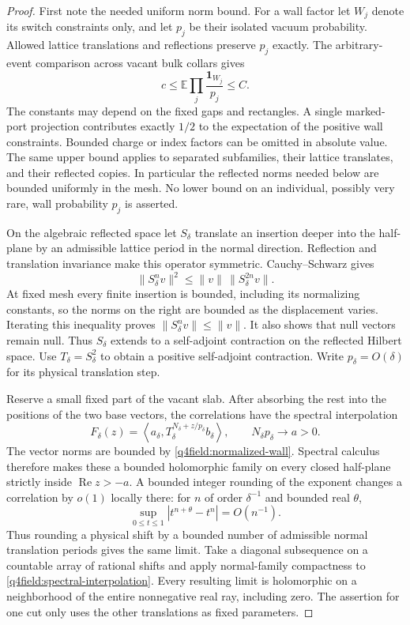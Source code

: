 \begin{proof}
First note the needed uniform norm bound.  For a wall factor let
$W_j$ denote its switch constraints only, and let $p_j$ be their
isolated vacuum probability.  Allowed lattice translations and
reflections preserve $p_j$ exactly.
The arbitrary-event comparison across vacant bulk collars gives
\begin{equation}\label{q4field:normalized-wall}
 c\le\mathbb E\prod_j\frac{\mathbf1_{W_j}}{p_j}\le C.
\end{equation}
The constants may depend on the fixed gaps and rectangles.  A single
marked-port projection contributes exactly $1/2$ to the expectation
of the positive wall constraints.  Bounded charge or index factors
can be omitted in absolute value.  The same upper bound applies to
separated subfamilies, their lattice translates, and their reflected
copies.  In particular the reflected norms needed below are bounded
uniformly in the mesh.  No lower bound on an individual, possibly
very rare, wall probability $p_j$ is asserted.

On the algebraic reflected space let $S_\delta$ translate an insertion
deeper into the half-plane by an admissible lattice period in the
normal direction.  Reflection and translation invariance make this
operator symmetric.  Cauchy--Schwarz gives
\[
 \|S_\delta^n v\|^2
       \le \|v\|\,\|S_\delta^{2n}v\|.
\]
At fixed mesh every finite insertion is bounded, including its
normalizing constants, so the norms on the right are bounded as the
displacement varies.  Iterating this inequality proves
$\|S_\delta^n v\|\le\|v\|$.  It also shows that null vectors remain
null.  Thus $S_\delta$ extends to a self-adjoint contraction on the
reflected Hilbert space.  Use $T_\delta=S_\delta^2$ to obtain a
positive self-adjoint contraction.  Write $p_\delta=O(\delta)$ for
its physical translation step.

Reserve a small fixed part of the vacant slab.  After absorbing the
rest into the positions of the two base vectors, the correlations
have the spectral interpolation
\begin{equation}\label{q4field:spectral-interpolation}
 F_\delta(z)=
  \left\langle a_\delta,
    T_\delta^{N_\delta+z/p_\delta}b_\delta\right\rangle,
 \qquad N_\delta p_\delta\longrightarrow a>0.
\end{equation}
The vector norms are bounded by \eqref{q4field:normalized-wall}.
Spectral calculus therefore makes these a bounded holomorphic
family on every closed half-plane strictly inside
$\operatorname{Re}z>-a$.  A bounded integer rounding of the exponent
changes a correlation by $o(1)$ locally there: for $n$ of order
$\delta^{-1}$ and bounded real $\theta$,
\[
 \sup_{0\le t\le1}|t^{n+\theta}-t^n|=O(n^{-1}).
\]
Thus rounding a physical shift by a bounded number of admissible
normal translation periods gives the same limit.  Take a diagonal
subsequence on a countable array of
rational shifts and apply normal-family compactness to
\eqref{q4field:spectral-interpolation}.  Every resulting limit is
holomorphic on a neighborhood of the entire nonnegative real ray,
including zero.  The assertion for one cut only uses the other
translations as fixed parameters.
\end{proof}

